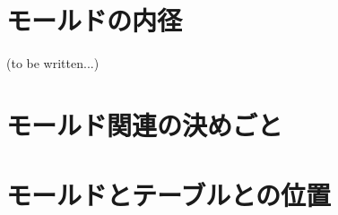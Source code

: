 \chapter{モールドの内径}
%
(to be written...)



\begin{appendices}
\Apart




\chapter{モールド関連の決めごと}






\chapter{モールドとテーブルとの位置}






\end{appendices}
